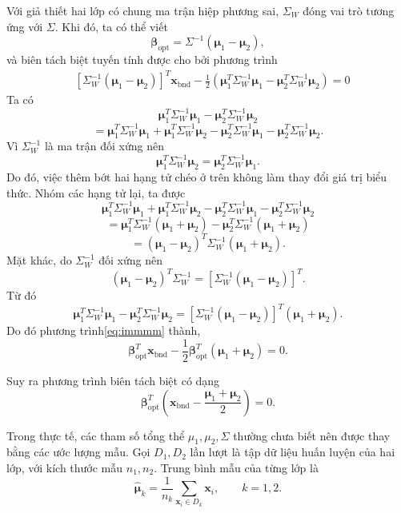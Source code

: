 Với giả thiết hai lớp có chung ma trận hiệp phương sai, $\Sigma_W$ đóng vai trò tương ứng với $\Sigma$. Khi đó, ta có thể viết
\[
\bm{\beta}_{\text{opt}}
=
\Sigma^{-1}(\bm{\mu}_1-\bm{\mu}_2),
\]
và biên tách biệt tuyến tính được cho bởi phương trình
\begin{equation}
	\begin{aligned}
		&\left[{\Sigma}_W^{-1}(\bm{\mu}_1-\bm{\mu}_2)\right]^T
		\bm{x}_{\text{bnd}}
		-
		\frac{1}{2}
		\left(
		\bm{\mu}_1^T{\Sigma}_W^{-1}\bm{\mu}_1
		-
		\bm{\mu}_2^T{\Sigma}_W^{-1}\bm{\mu}_2
		\right)
		=0
	\end{aligned}
	\label{eq:immmm}
\end{equation}
Ta có \[ \bm{\mu}_1^T\Sigma_W^{-1}\bm{\mu}_1 - \bm{\mu}_2^T\Sigma_W^{-1}\bm{\mu}_2 \] \[ = \bm{\mu}_1^T\Sigma_W^{-1}\bm{\mu}_1 + \bm{\mu}_1^T\Sigma_W^{-1}\bm{\mu}_2 - \bm{\mu}_2^T\Sigma_W^{-1}\bm{\mu}_1 - \bm{\mu}_2^T\Sigma_W^{-1}\bm{\mu}_2. \] Vì \(\Sigma_W^{-1}\) là ma trận đối xứng nên \[ \bm{\mu}_1^T\Sigma_W^{-1}\bm{\mu}_2 = \bm{\mu}_2^T\Sigma_W^{-1}\bm{\mu}_1. \] Do đó, việc thêm bớt hai hạng tử chéo ở trên không làm thay đổi giá trị biểu thức. Nhóm các hạng tử lại, ta được \[ \bm{\mu}_1^T\Sigma_W^{-1}\bm{\mu}_1 + \bm{\mu}_1^T\Sigma_W^{-1}\bm{\mu}_2 - \bm{\mu}_2^T\Sigma_W^{-1}\bm{\mu}_1 - \bm{\mu}_2^T\Sigma_W^{-1}\bm{\mu}_2 \] \[ = \bm{\mu}_1^T\Sigma_W^{-1}(\bm{\mu}_1+\bm{\mu}_2) - \bm{\mu}_2^T\Sigma_W^{-1}(\bm{\mu}_1+\bm{\mu}_2) \] \[ = (\bm{\mu}_1-\bm{\mu}_2)^T \Sigma_W^{-1} (\bm{\mu}_1+\bm{\mu}_2). \] Mặt khác, do \(\Sigma_W^{-1}\) đối xứng nên \[ (\bm{\mu}_1-\bm{\mu}_2)^T\Sigma_W^{-1} = \left[ \Sigma_W^{-1}(\bm{\mu}_1-\bm{\mu}_2) \right]^T. \] Từ đó \[ \bm{\mu}_1^T\Sigma_W^{-1}\bm{\mu}_1 - \bm{\mu}_2^T\Sigma_W^{-1}\bm{\mu}_2 = \left[ \Sigma_W^{-1}(\bm{\mu}_1-\bm{\mu}_2) \right]^T (\bm{\mu}_1+\bm{\mu}_2). \]
Do đó phương trình\eqref{eq:immmm} thành,
\[
\bm{\beta}_{\text{opt}}^T\bm{x}_{\text{bnd}}
-
\frac{1}{2}
\bm{\beta}_{\text{opt}}^T
(\bm{\mu}_1+\bm{\mu}_2)
=
0.
\]

Suy ra phương trình biên tách biệt có dạng
\begin{equation}
	\bm{\beta}_{\text{opt}}^T
	\left(
	\bm{x}_{\text{bnd}}
	-
	\frac{\bm{\mu}_1+\bm{\mu}_2}{2}
	\right)
	=
	0.
	\tag{2.2}
\end{equation}


\hspace*{0.5cm}Trong thực tế, các tham số tổng thể $\mu_1,\mu_2,\Sigma$ thường chưa biết nên được thay bằng các ước lượng mẫu. Gọi $D_1,D_2$ lần lượt là tập dữ liệu huấn luyện của hai lớp, với kích thước mẫu $n_1,n_2$. Trung bình mẫu của từng lớp là
\[
\hat{\bm{\mu}}_k
=
\frac{1}{n_k}
\sum_{\bm{x}_i\in D_k}
\bm{x}_i,
\qquad k=1,2.
\]

